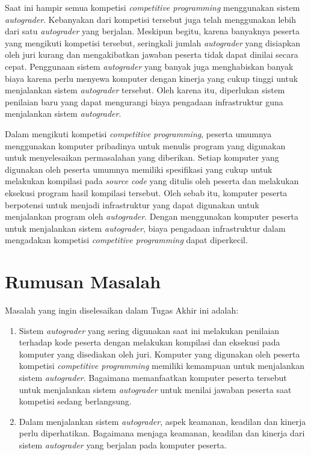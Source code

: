 \par Saat ini hampir semua kompetisi \textit{competitive programming} menggunakan sistem \textit{autograder}. Kebanyakan dari kompetisi tersebut juga telah menggunakan lebih dari satu \textit{autograder} yang berjalan. Meskipun begitu, karena banyaknya peserta yang mengikuti kompetisi tersebut, seringkali jumlah \textit{autograder} yang disiapkan oleh juri kurang dan mengakibatkan jawaban peserta tidak dapat dinilai secara cepat. Penggunaan sistem \textit{autograder} yang banyak juga menghabiskan banyak biaya karena perlu menyewa komputer dengan kinerja yang cukup tinggi untuk menjalankan sistem \textit{autograder} tersebut. Oleh karena itu, diperlukan sistem penilaian baru yang dapat mengurangi biaya pengadaan infrastruktur guna menjalankan sistem \textit{autograder}.

\par Dalam mengikuti kompetisi \textit{competitive programming}, peserta umumnya menggunakan komputer pribadinya untuk menulis program yang digunakan untuk menyelesaikan permasalahan yang diberikan. Setiap komputer yang digunakan oleh peserta umumnya memiliki spesifikasi yang cukup untuk melakukan kompilasi pada \textit{source code} yang ditulis oleh peserta dan melakukan eksekusi program hasil kompilasi tersebut. Oleh sebab itu, komputer peserta berpotensi untuk menjadi infrastruktur yang dapat digunakan untuk menjalankan program oleh \textit{autograder}. Dengan menggunakan komputer peserta untuk menjalankan sistem \textit{autograder}, biaya pengadaan infrastruktur dalam mengadakan kompetisi \textit{competitive programming} dapat diperkecil.

\section{Rumusan Masalah}

\par Masalah yang ingin diselesaikan dalam Tugas Akhir ini adalah:
\begin{enumerate}
	\item Sistem \textit{autograder} yang sering digunakan saat ini melakukan penilaian terhadap kode peserta dengan melakukan kompilasi dan eksekusi pada komputer yang disediakan oleh juri. Komputer yang digunakan oleh peserta kompetisi \textit{competitive programming} memiliki kemampuan untuk menjalankan sistem \textit{autograder}. Bagaimana memanfaatkan komputer peserta tersebut untuk menjalankan sistem \textit{autograder} untuk menilai jawaban peserta saat kompetisi sedang berlangsung.
	\item Dalam menjalankan sistem \textit{autograder}, aspek keamanan, keadilan dan kinerja perlu diperhatikan. Bagaimana menjaga keamanan, keadilan dan kinerja dari sistem \textit{autograder} yang berjalan pada komputer peserta.
\end{enumerate}

